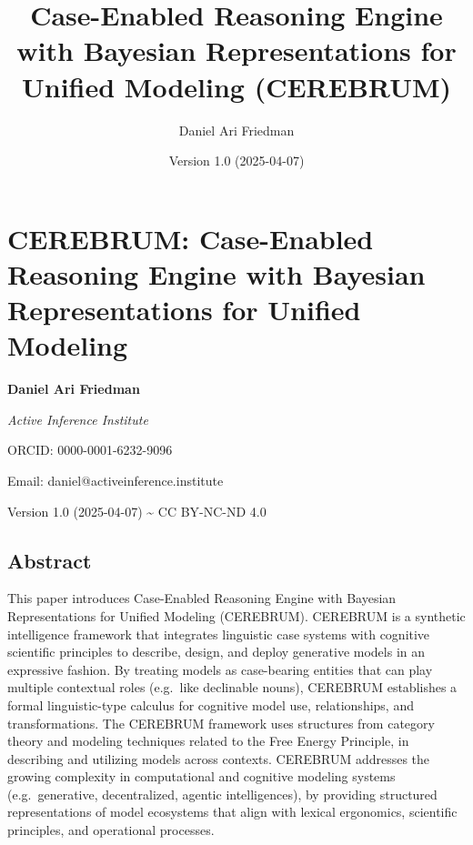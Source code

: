 
\title{Case-Enabled Reasoning Engine with Bayesian Representations for Unified Modeling (CEREBRUM)}
\author{Daniel Ari Friedman}
\date{Version 1.0 (2025-04-07)}


\maketitle


\renewcommand{\contentsname}{Contents}
{
\setcounter{tocdepth}{2}
\tableofcontents
}


\hypertarget{cerebrum-case-enabled-reasoning-engine-with-bayesian-representations-for-unified-modeling}{%
\chapter{CEREBRUM: Case-Enabled Reasoning Engine with Bayesian
Representations for Unified
Modeling}\label{cerebrum-case-enabled-reasoning-engine-with-bayesian-representations-for-unified-modeling}}

\textbf{Daniel Ari Friedman}

\emph{Active Inference Institute}

ORCID: 0000-0001-6232-9096

Email: daniel@activeinference.institute

Version 1.0 (2025-04-07) \textasciitilde{} CC BY-NC-ND 4.0

\hypertarget{abstract}{%
\section{Abstract}\label{abstract}}

This paper introduces Case-Enabled Reasoning Engine with Bayesian
Representations for Unified Modeling (CEREBRUM). CEREBRUM is a synthetic
intelligence framework that integrates linguistic case systems with
cognitive scientific principles to describe, design, and deploy
generative models in an expressive fashion. By treating models as
case-bearing entities that can play multiple contextual roles (e.g.~like
declinable nouns), CEREBRUM establishes a formal linguistic-type
calculus for cognitive model use, relationships, and transformations.
The CEREBRUM framework uses structures from category theory and modeling
techniques related to the Free Energy Principle, in describing and
utilizing models across contexts. CEREBRUM addresses the growing
complexity in computational and cognitive modeling systems
(e.g.~generative, decentralized, agentic intelligences), by providing
structured representations of model ecosystems that align with lexical
ergonomics, scientific principles, and operational processes.

